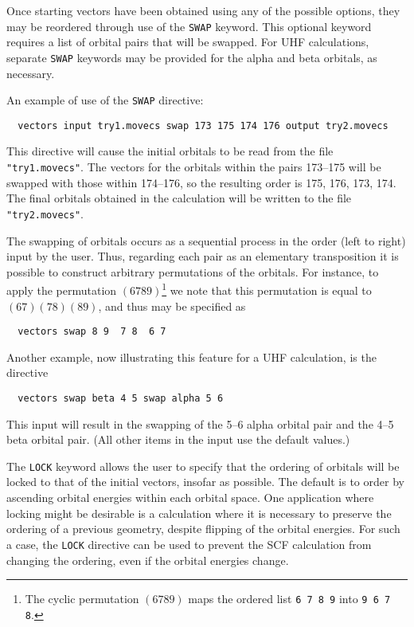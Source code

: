 Once starting vectors have been obtained using any of the possible
options, they may be reordered through use of the \verb+SWAP+ keyword.
This optional keyword requires a list of orbital pairs that will be
swapped.  For UHF calculations, separate \verb+SWAP+ keywords may be
provided for the alpha and beta orbitals, as necessary.

An example of use of the \verb+SWAP+ directive:
\begin{verbatim}
  vectors input try1.movecs swap 173 175 174 176 output try2.movecs
\end{verbatim}
This directive will cause the initial orbitals to be read from the
file \verb+"try1.movecs"+.  The vectors for the orbitals within the
pairs 173--175 will be swapped with those within 174--176, so the
resulting order is 175, 176, 173, 174.  The final orbitals obtained in
the calculation will be written to the file \verb+"try2.movecs"+.

The swapping of orbitals occurs as a sequential process in the order
(left to right) input by the user.  Thus, regarding each pair as an
elementary transposition it is possible to construct arbitrary
permutations of the orbitals.  For instance, to apply the permutation
$(6 7 8 9)$\footnote{The cyclic permutation $(6 7 8 9)$ maps the
  ordered list {\tt 6 7 8 9} into {\tt 9 6 7 8}.} we note that this
permutation is equal to $(6 7)(7 8)(8 9)$, and thus may be specified
as
\begin{verbatim}
  vectors swap 8 9  7 8  6 7
\end{verbatim}

Another example, now illustrating this feature for a UHF calculation,
is the directive
\begin{verbatim}
  vectors swap beta 4 5 swap alpha 5 6
\end{verbatim}
This input will result in the swapping of the 5--6 alpha orbital pair
and the 4--5 beta orbital pair.  (All other items in the input use the
default values.)

The \verb+LOCK+ keyword allows the user to specify that the ordering
of orbitals will be locked to that of the initial vectors, insofar as
possible. The default is to order by ascending orbital energies within
each orbital space. One application where locking might be desirable
is a calculation where it is necessary to preserve the ordering of a
previous geometry, despite flipping of the orbital energies.  For such
a case, the \verb+LOCK+ directive can be used to prevent the SCF
calculation from changing the ordering, even if the orbital energies
change.

